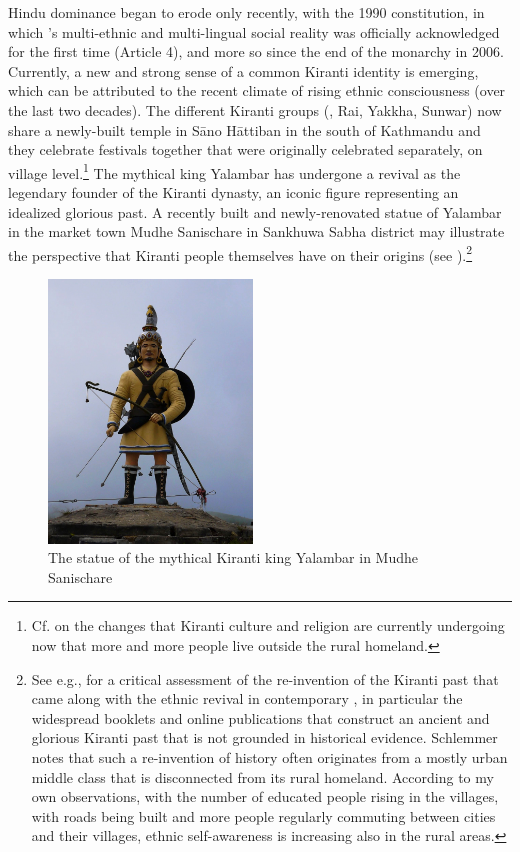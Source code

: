 Hindu dominance began to erode only recently, with the 1990 constitution, in which 's multi-ethnic and multi-lingual social reality was officially acknowledged for the first time (Article 4), and more so since the end of the monarchy in 2006. Currently, a new and strong sense of a common Kiranti identity is emerging, which can be attributed to the recent climate of rising ethnic consciousness (over the last two decades). The different Kiranti groups (, Rai, Yakkha, Sunwar) now share a newly-built temple in Sāno Hāttiban in the south of Kathmandu and they celebrate festivals together that were originally celebrated separately, on
village level.\footnote{Cf. \citet{Gaenszle_Redefining} on the changes that Kiranti culture and religion are currently undergoing now that more and more people live outside the rural homeland.}  The mythical king Yalambar has undergone a revival as the legendary founder of the Kiranti dynasty, an iconic figure representing an idealized glorious past. A recently built and newly-renovated statue of Yalambar in the market town Mudhe Sanischare in Sankhuwa Sabha district may illustrate the perspective that Kiranti people themselves have on their origins (see ).\footnote{See e.g., \citet{Schlemmer2003_New} for a critical assessment of the re-invention of the Kiranti past that came along with the ethnic revival in contemporary , in particular the widespread booklets and online publications that construct an ancient and glorious Kiranti past that is not grounded in historical evidence. Schlemmer notes that such a re-invention of history often originates from a mostly urban middle class that is disconnected from its rural homeland. According to my own observations, with the number of educated people rising in the villages, with roads being built and more people regularly commuting between cities and their villages, ethnic self-awareness is increasing also in the rural areas.}

\begin{figure}
\centering
\includegraphics[height=7cm]{figures/yalambar.jpg}
\caption{The statue of the mythical Kiranti king Yalambar in Mudhe Sanischare}\label{yalambar}
\end{figure}

